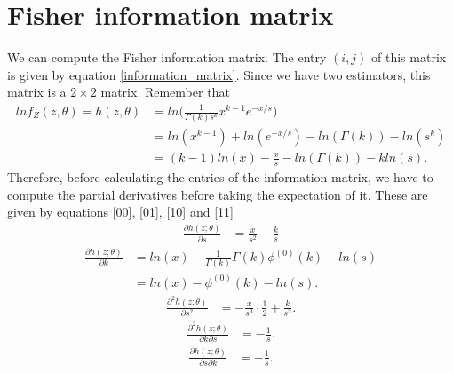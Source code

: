\documentclass[final]{aomart}
\newtheorem[{}\it]{thm}{Theorem}[section]
\theoremstyle{definition}
\newtheorem*[{}\it]{notation}{Notation}
\numberwithin{equation}{section}
\begin{document}
\section{Fisher information matrix}
We can compute the Fisher information matrix. The entry $(i,j)$ of this matrix is given by equation \ref{information_matrix}. Since we have two estimators, this matrix is a $2\times 2$ matrix. Remember that
\begin{equation}
	\begin{aligned}
	lnf_Z(z,\theta) = h(z,\theta) & = ln\bigg( \frac{1}{\Gamma(k)s^k}x^{k-1}e^{-x/s} \bigg)\\
						   & = ln(x^{k-1}) + ln(e^{-x/s}) - ln(\Gamma(k)) - ln(s^k)\\
						   & = (k-1)ln(x) - \frac{x}{s} - ln(\Gamma(k)) - kln(s).
	\end{aligned}
\end{equation}
Therefore, before calculating the entries of the information matrix, we have to compute the partial derivatives before taking the expectation of it. These are given by equations \ref{00}, \ref{01}, \ref{10} and \ref{11}
\begin{equation}
	\begin{aligned}
	\frac{\partial h(z;\theta)}{\partial s} & = \frac{x}{s^2} - \frac{k}{s}
	\end{aligned}
\end{equation}
\begin{equation}
	\begin{aligned}
	\frac{\partial h(z;\theta)}{\partial k} & = ln(x) - \frac{1}{\Gamma(k)}\Gamma(k)\phi^{(0)}(k) - ln(s)\\
														  & = ln(x) - \phi^{(0)}(k) - ln(s).
	\end{aligned}
\end{equation}
\begin{equation}
	\begin{aligned}
	\frac{\partial^2h(z;\theta)}{\partial s^2} & = -\frac{x}{s^3}\cdot\frac{1}{2} + \frac{k}{s^2}.
	\end{aligned}
	\label{00}
\end{equation}
\begin{equation}
	\begin{aligned}
	\frac{\partial^2 h(z;\theta)}{\partial k \partial s} & = -\frac{1}{s}.
	\end{aligned}
	\label{01}
\end{equation}
\begin{equation}
	\begin{aligned}
	\frac{\partial h(z; \theta)}{\partial s \partial k} & = -\frac{1}{s}.
	\end{aligned}
	\label{10}
\end{equation}
\end{document}
